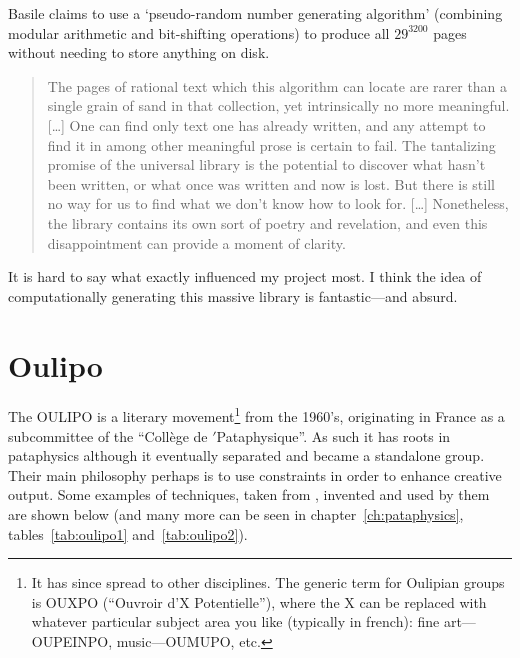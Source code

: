 Basile claims to use a `pseudo-random number generating algorithm' (combining modular arithmetic and bit-shifting operations) to produce all $29^{3200}$ pages without needing to store anything on disk.

\begin{quotation}
  The pages of rational text which this algorithm can locate are rarer than a single grain of sand in that collection, yet intrinsically no more meaningful.
  [\ldots]
  One can find only text one has already written, and any attempt to find it in among other meaningful prose is certain to fail. The tantalizing promise of the universal library is the potential to discover what hasn’t been written, or what once was written and now is lost. But there is still no way for us to find what we don’t know how to look for.
  [\ldots]
  Nonetheless, the library contains its own sort of poetry and revelation, and even this disappointment can provide a moment of clarity. 
\end{quotation}

It is hard to say what exactly influenced my project most. I think the idea of computationally generating this massive library is fantastic---and absurd.


\section{Oulipo}
\label{s:oulipo}

The \ac{OULIPO} is a literary movement\footnote{It has since spread to other disciplines. The generic term for Oulipian groups is OUXPO (``Ouvroir d'X Potentielle''), where the X can be replaced with whatever particular subject area you like (typically in french): fine art---OUPEINPO, music---OUMUPO, etc.} from the 1960's, originating in France as a subcommittee of the ``Coll\`{e}ge de $'$Pataphysique''. As such it has roots in pataphysics although it eventually separated and became a standalone group. Their main philosophy perhaps is to use constraints in order to enhance creative output. Some examples of techniques, taken from \autocite{Mathews2005}, invented and used by them are shown below (and many more can be seen in chapter~\ref{ch:pataphysics}, tables~\ref{tab:oulipo1} and~\ref{tab:oulipo2}).

